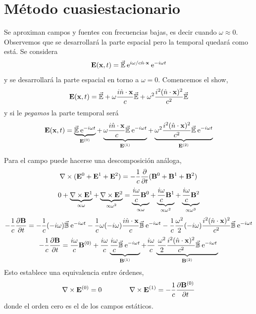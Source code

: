 \documentclass[10pt,oneside]{CBFT_book}
\begin{document}
\section{Método cuasiestacionario}

Se aproximan campos y fuentes con frecuencias bajas, es decir cuando $\omega \approx 0$.
Observemos que se desarrollará la parte espacial pero la temporal quedará como está.
Se considera
\[
	\vb{E}(\vb{x},t) = \vec{\mathbb{E}} \euler^{i\omega/c \hat{n}\cdot\vb{x}} \euler^{-i\omega t}
\]
y se desarrollará la parte espacial en torno a $\omega=0$. Comencemos el show,
\[
	\vb{E}(\vb{x},t) = \vec{\mathbb{E}} + \omega\frac{i\hat{n}\cdot\vb{x}}{c} \vec{\mathbb{E}} +
			\omega^2 \frac{i^2(\hat{n}\cdot\vb{x})^2}{c^2} \vec{\mathbb{E}}
\]
y si le {\it pegamos} la parte temporal será
\[
	\vb{E}(\vb{x},t) = \underbrace{ \vec{\mathbb{E}} \euler^{-i\omega t} }_{\vb{E}^{(0)}} + 
	\underbrace{\omega\frac{i\hat{n}\cdot\vb{x}}{c} \vec{\mathbb{E}}\euler^{-i\omega t}}_{\vb{E}^{(1)}} +
	\underbrace{\omega^2\frac{i^2(\hat{n}\cdot\vb{x})^2}{c^2}\vec{\mathbb{E}}\euler^{-i\omega t}}_{\vb{E}^{(2)}}
\]

Para el campo  puede hacerse una descomposición análoga,
\[
	\rotorm{}(\vb{E}^0 + \vb{E}^1 + \vb{E}^2) = -\frac{1}{c} \dpar{}{t}(\vb{B}^0 + \vb{B}^1 + \vb{B}^2)
\]
\[
	0 + \underbrace{\rotorm{E}^1}_{\propto \omega } + \underbrace{\rotorm{E}^2}_{\propto \omega^2 } = 
	\underbrace{\frac{i\omega}{c}\vb{B}^0}_{\propto \omega } + \underbrace{\frac{i\omega}{c}
	\vb{B}^1}_{\propto \omega^2 } + \underbrace{\frac{i\omega}{c}\vb{B}^2}_{\propto \omega^3 }
\]
\[
	-\frac{1}{c}\dpar{\vb{B}}{t} = -\frac{1}{c}(-i\omega)\vec{\mathbb{B}}\euler^{-i\omega t}
	-\frac{1}{c}\omega(-i\omega)\frac{i\hat{n}\cdot\vb{x}}{c}\vec{\mathbb{B}}\euler^{-i\omega t}
	-\frac{1}{c}\frac{\omega^2}{2}(-i\omega)\frac{i^2(\hat{n}\cdot\vb{x})^2}{c^2}\vec{\mathbb{B}}\euler^{-i\omega t}
\]
\[
	-\frac{1}{c}\dpar{\vb{B}}{t} = \frac{i\omega}{c}\vb{B}^{(0)} 
	+ \frac{i\omega}{c} \underbrace{\frac{i\omega}{c}\vec{\mathbb{B}}\euler^{-i\omega t}}_{\vb{B}^{(1)}}
	+ \frac{i\omega}{c} \underbrace{ \left.\frac{\omega^2}{2}\frac{i^2(\hat{n}\cdot\vb{x})^2}	
	{c^2}\vec{\mathbb{B}} \euler^{-i\omega t}\right.}_{\vb{B}^{(2)}}
\]
Esto establece una equivalencia entre órdenes,
\[
	\rotorm{E}^{(0)} = 0 \qquad \qquad \rotorm{E}^{(1)} = -\frac{1}{c}\dpar{\vb{B}^{(0)}}{t}
\]
donde el orden cero es el de los campos estáticos.
\end{document}
